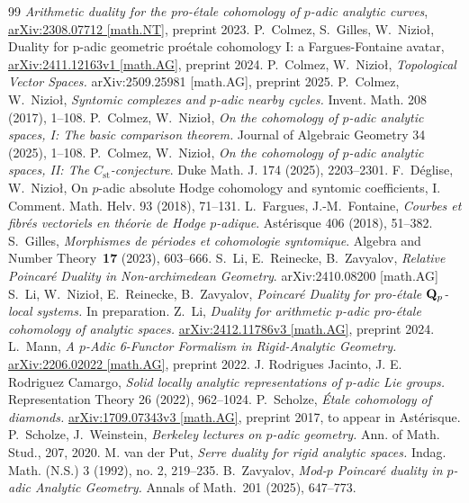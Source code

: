 \documentclass[10pt,reqno]{amsart}
\theoremstyle{definition}
\theoremstyle{remark}
\newcommand{\st}{\operatorname{st} }
\numberwithin{equation}{section}
\def\Q{{\bf Q}} \def\Z{{\bf Z}}
\numberwithin{equation}{section}
\begin{document}
\begin{thebibliography}{99}
{\em Arithmetic duality  for the pro-\'etale cohomology of $p$-adic analytic curves},
\url{arXiv:2308.07712 [math.NT]}, preprint 2023.
P.~Colmez, S.~Gilles, W.~Nizio\l,
Duality for p-adic geometric pro\'etale cohomology I: a Fargues-Fontaine avatar,
\url{arXiv:2411.12163v1 [math.AG]}, preprint 2024.
 P.~Colmez, W.~Nizio\l,  {\em Topological Vector Spaces.} 	arXiv:2509.25981 [math.AG], preprint 2025.
 P.~Colmez, W.~Nizio\l,  
{\em Syntomic complexes and $p$-adic nearby cycles.} Invent. Math. 208 (2017), 1--108.
   P.~Colmez, W.~Nizio\l, {\em On the cohomology of $p$-adic analytic spaces, I: The basic comparison theorem.}  	Journal of Algebraic Geometry 34 (2025), 1--108.
    P.~Colmez, W.~Nizio\l,  {\em On the cohomology of $p$-adic analytic spaces, II: The $C_{\st}$-conjecture}.  
Duke Math. J. 174 (2025), 2203--2301.
  F.~D\'eglise, W.~Nizio{\l}, {On $p$-adic absolute Hodge cohomology and syntomic coefficients, I.}  Comment. Math. Helv. 93 (2018),  71--131.
  L.~Fargues, J.-M.~Fontaine, {\em Courbes et fibr\'es vectoriels en th\'eorie de Hodge $p$-adique}. Ast\'erisque 406 (2018), 51--382.
   S.~Gilles, {\em Morphismes de p\'eriodes et cohomologie syntomique}.
Algebra and Number Theory~{\bf 17} (2023), 603--666.
 S.~Li, E.~Reinecke, B.~Zavyalov, {\em Relative Poincar\'e Duality in Non-archimedean Geometry}. arXiv:2410.08200 [math.AG]
 S.~Li, W.~Nizio{\l}, E.~Reinecke, B.~Zavyalov, {\em Poincar\'e Duality for pro-\'etale $\Q_p$-local systems. } In preparation.
 Z.~Li, {\em Duality for arithmetic $p$-adic pro-\'etale cohomology of analytic spaces.}  
\url{arXiv:2412.11786v3 [math.AG]}, preprint 2024.
 L.~Mann, {\em A $p$-Adic 6-Functor Formalism in Rigid-Analytic Geometry.}  	
\url{arXiv:2206.02022 [math.AG]}, preprint 2022.
 J. Rodrigues Jacinto, J. E. Rodriguez Camargo, {\em Solid locally analytic representations of $p$-adic Lie groups.} Representation Theory 26 (2022), 962--1024.
 P.~Scholze, {\em  \'Etale cohomology of diamonds.} 
\url{arXiv:1709.07343v3 [math.AG]}, preprint 2017, to appear in Ast\'erisque.
 P.~Scholze, J.~Weinstein, {\em Berkeley lectures on $p$-adic geometry.} Ann. of Math. Stud., 207,  2020.
 M. van der Put, {\em Serre duality for rigid analytic spaces.}  Indag. Math. (N.S.) 3 (1992), no. 2, 219--235.
 B.~Zavyalov, {\em Mod-$p$ Poincar\'e duality in $p$-adic Analytic Geometry.}  
Annals of Math.~201 (2025), 647--773.
\end{thebibliography}
\end{document}
